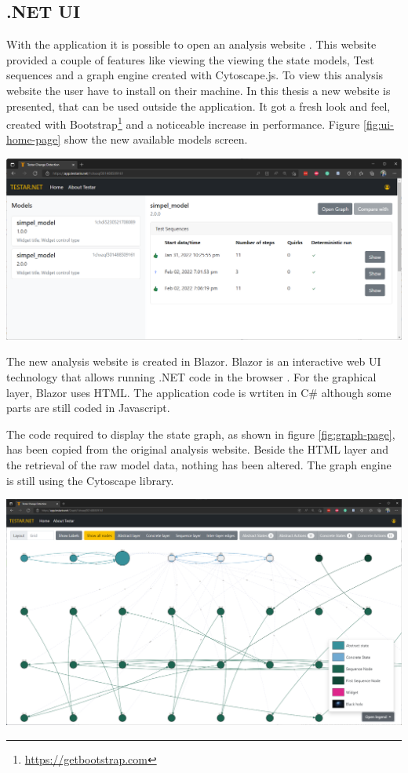 \subsection{.NET UI}
With the \testar application it is possible to open an analysis website \cite{thesisMulders}. This website provided a couple of features like viewing the viewing the state models, Test sequences and a graph engine created with Cytoscape.js. To view this analysis website the user have to install \testar on their machine. In this thesis a new website is presented, that can be used outside the \testar application. It got a fresh look and feel, created with Bootstrap\footnote{\url{https://getbootstrap.com}} and a noticeable increase in performance. Figure \ref{fig:ui-home-page} show the new available models screen. 

\begingroup
\captionsetup{type=figure}
\includegraphics[scale=0.4]{thesis/images/ui-home-page.png}
\label{fig:ui-home-page}
\endgroup

The new \testar analysis website is created in Blazor. Blazor is an interactive web UI technology that allows running .NET code in the browser \cite{what-is-blazor}. For the graphical layer, Blazor uses HTML. The application code is wrtiten in C\# although some parts are still coded in Javascript. 

The code required to display the state graph, as shown in figure \ref{fig:graph-page}, has been copied from the original \testar analysis website. Beside the HTML layer and the retrieval of the raw model data, nothing has been altered. The graph engine is still using the Cytoscape library. 

\begingroup
\captionsetup{type=figure}
\includegraphics[scale=0.3]{thesis/images/graph-page.png}
\label{fig:graph-page}
\endgroup

